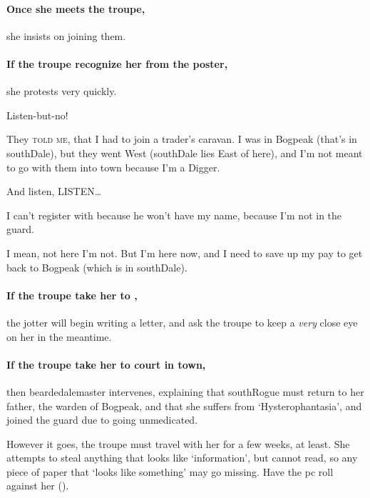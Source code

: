 \paragraph{Once she meets the troupe,}
she insists on joining them.

\paragraph{If the troupe recognize her from the poster,}
she protests very quickly.

\begin{speechtext}
  Listen-but-no!
  
  They {\scshape told me}, that I had to join a trader's caravan.
  I was in Bogpeak (that's in \gls{southDale}), but they went West (\gls{southDale} lies East of here), and I'm not meant to go with them into \gls{town} because I'm a Digger.
  
  And listen, LISTEN\ldots

  I can't register with  because he won't have my name, because I'm not in the \gls{guard}.

  I mean, not here I'm not.
  But I'm here now, and I need to save up my pay to get back to Bogpeak (which is in \gls{southDale}).
\end{speechtext}

\paragraph{If the troupe take her to ,}
the \gls{jotter} will begin writing a letter, and ask the troupe to keep a \textit{very} close eye on her in the meantime.

\paragraph{If the troupe take her to \gls{court} in \gls{town},}
then \gls{beardedalemaster} intervenes, explaining that \gls{southRogue} must return to her father, the \gls{warden} of Bogpeak, and that she suffers from `Hysterophantasia', and joined the \gls{guard} due to going unmedicated.

\southRogue

However it goes, the troupe must travel with her for a few weeks, at least.
She attempts to steal anything that looks like `information', but cannot read, so any piece of paper that `looks like something' may go missing.
Have the \gls{pc} roll  against her  (\tn).

